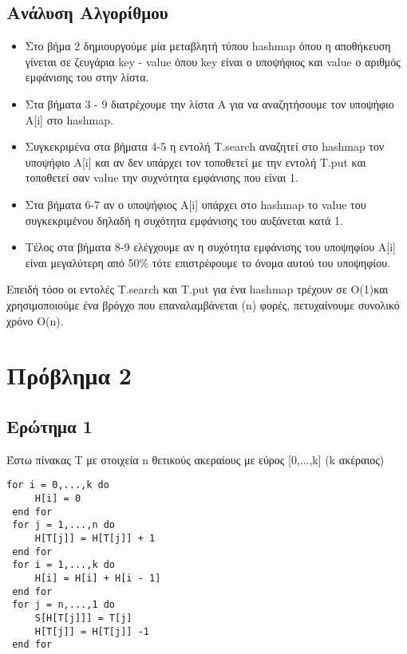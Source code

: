 \documentclass[a4paper]{article}
\begin{document}
\begin{itemize}
\subsection*{Ανάλυση Αλγορίθμου}
\begin{itemize}
\item Στο βήμα 2 δημιουργούμε μία μεταβλητή τύπου hashmap όπου η αποθήκευση γίνεται σε ζευγάρια key - value όπου key είναι ο υποψήφιος και value ο αριθμός εμφάνισης του στην λίστα.
\item Στα βήματα 3 - 9 διατρέχουμε την λίστα Α για να αναζητήσουμε τον υποψήφιο Α[i] στο hashmap.
\item Συγκεκριμένα στα βήματα 4-5 η εντολή T.search αναζητεί στο hashmap τον υποψήφιο Α[i] και αν δεν υπάρχει τον τοποθετεί με την εντολή T.put και τοποθετεί σαν value την συχνότητα εμφάνισης που είναι 1.
\item Στα βήματα 6-7 αν ο υποψήφιος Α[i] υπάρχει στο hashmap το value του συγκεκριμένου δηλαδή η συχότητα εμφάνισης του αυξάνεται κατά 1.
\item Τέλος στα βήματα 8-9 ελέγχουμε αν η συχότητα εμφάνισης του υποψηφίου Α[i] είναι μεγαλύτερη από 50\% τότε επιστρέφουμε το όνομα αυτού του υποψηφίου. 
\end{itemize}
Επειδή τόσο οι εντολές T.search και Τ.put για ένα hashmap τρέχουν σε O(1)\footnotemark[7] και χρησιμοποιούμε ένα βρόγχο που επαναλαμβάνεται (n) φορές, πετυχαίνουμε συνολικό χρόνο O(n).

\pagebreak
\section*{Πρόβλημα 2}
\subsection*{\color{red}Ερώτημα 1}


\begin{tcolorbox}[colback=blue!20!white,colframe=purple!60!white,title=\textbf{Algorithm 1}]
Έστω πίνακας T με στοιχεία n θετικούς ακεραίους με εύρος [0,...,k] (k ακέραιος)
\begin{lstlisting}[mathescape]
 for i = 0,...,k do
	 H[i] = 0
 end for
 for j = 1,...,n do
	 H[T[j]] = H[T[j]] + 1
 end for
 for i = 1,...,k do
	 H[i] = H[i] + H[i - 1]
 end for
 for j = n,...,1 do
	 S[H[T[j]]] = T[j]
	 H[T[j]] = H[T[j]] -1
 end for
\end{lstlisting}
\end{tcolorbox}


\end{itemize}
\end{document}
